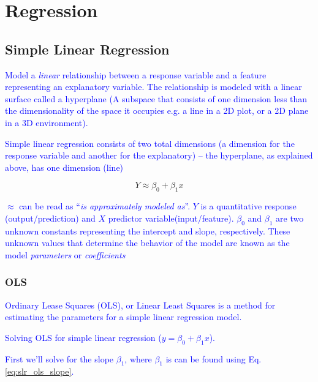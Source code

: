 \section{Regression}



\subsection{Simple Linear Regression}

\textcolor{blue}{Model a \emph{linear} relationship between a response variable and a feature representing an explanatory variable. The relationship is modeled with a linear surface called a hyperplane (A subspace that consists of one dimension less than the dimensionality of the space it occupies e.g. a line in a 2D plot, or a 2D plane in a 3D environment).}

\textcolor{blue}{Simple linear regression consists of two total dimensions (a dimension for the response variable and another for the explanatory) -- the hyperplane, as explained above, has one dimension (line)}

\begin{equation}
{Y \approx \beta_0 + \beta_1 x}
\label{eq:slr_ex}
\end{equation}

\textcolor{blue}{$\approx$ can be read as ``\emph{is approximately modeled as}''. $Y$ is a quantitative response (output/prediction) and $X$ predictor variable(input/feature). $\beta_0$ and $\beta_1$ are two unknown constants representing the intercept and slope, respectively. These unknown values that determine the behavior of the model are known as the model \emph{parameters} or \emph{coefficients}}

\subsubsection{OLS}

\textcolor{blue}{{Ordinary Lease Squares (OLS)}, or {Linear Least Squares} is a method for estimating the parameters for a simple linear regression model.}

\textcolor{blue}{Solving OLS for simple linear regression ($y=\beta_0 + \beta_1 x$).}

\textcolor{blue}{First we'll solve for the slope $\beta_1$, where $\beta_1$ is can be found using Eq.\ref{eq:slr_ols_slope}.}

